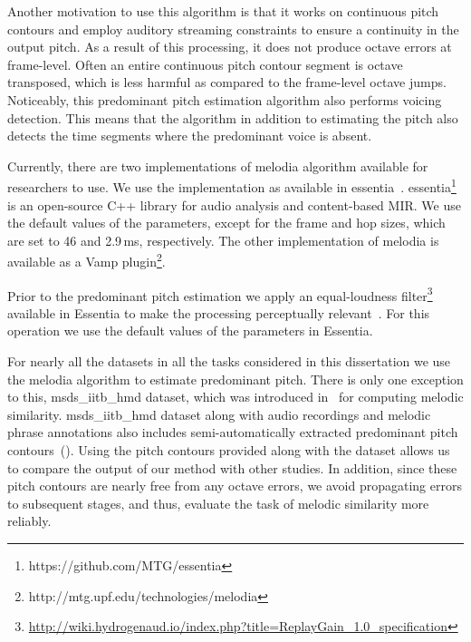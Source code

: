{Another motivation to use this algorithm is that it works on continuous pitch contours and employ auditory streaming constraints to ensure a continuity in the output pitch. As a result of this processing, it does not produce octave errors at frame-level. Often an entire continuous pitch contour segment is octave transposed, which is less harmful as compared to the frame-level octave jumps. Noticeably, this predominant pitch estimation algorithm also performs voicing detection. This means that the algorithm in addition to estimating the pitch also detects the time segments where the predominant voice is absent. %

Currently, there are two implementations of \gls{melodia} algorithm available for researchers to use. We use the implementation as available in \Gls{essentia}~\citep{essentia}. \Gls{essentia}\footnote{https://github.com/MTG/essentia} is an open-source C++ library for audio analysis and content-based MIR. We use the default values of the parameters, except for the frame and hop sizes, which are set to 46 and 2.9\,ms, respectively. The other implementation of \Gls{melodia} is available as a Vamp plugin\footnote{http://mtg.upf.edu/technologies/melodia}. 

Prior to the predominant pitch estimation we apply an equal-loudness filter\footnote{\url{http://wiki.hydrogenaud.io/index.php?title=ReplayGain_1.0_specification}} available in Essentia to make the processing perceptually relevant~\citep{essentia}. For this operation we use the default values of the parameters in Essentia. 

For nearly all the datasets in all the tasks considered in this dissertation we use the \Gls{melodia} algorithm to estimate predominant pitch. There is only one exception to this, \acrshort{msds_iitb_hmd} dataset, which was introduced in~\cite{Ross2012b} for computing melodic similarity. \acrshort{msds_iitb_hmd} dataset along with audio recordings and melodic phrase annotations also includes semi-automatically extracted predominant pitch contours~(). Using the pitch contours provided along with the dataset allows us to compare the output of our method with other studies. In addition, since these pitch contours are nearly free from any octave errors, we avoid propagating errors to subsequent stages, and thus, evaluate the task of melodic similarity more reliably. 

}
